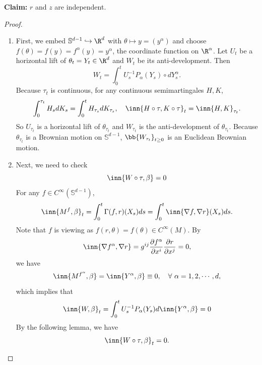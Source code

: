 \begin{exam}
    \textbf{Claim:} $r$ and $z$ are independent.
    \begin{proof}
        \begin{enumerate}[label=\Roman*.]
            \item First, we embed $\mathbb{S}^{d-1} \hookrightarrow \R^d$ with $\theta \mapsto y = (y^\alpha)$ and choose $f(\theta) = f(y) = f^\alpha(y) = y^\alpha$, the coordinate function on $\R^\alpha$. Let $U_t$ be a horizontal lift of $\theta_t = Y_t \in \R^d$ and $W_t$ be its anti-development. Then
            \begin{equation*}
                W_t = \int_0^t U_s^{-1}P_\alpha(Y_s) \circ dY^\alpha_s.
            \end{equation*}
            Because $\tau_t$ is continuous, for any continuous semimartingales $H,K$,
            \begin{equation*}
                \int_0^{\tau_t} H_sdK_s = \int_0^t H_{\tau_s} dK_{\tau_s},\quad \inn{H \circ \tau,K \circ \tau}_t = \inn{H,K}_{\tau_t}.
            \end{equation*}
            So $U_{\tau_t}$ is a horizontal lift of $\theta_{\tau_t}$ and $W_{\tau_t}$ is the anti-development of $\theta_{\tau_t}$. Because $\theta_{\tau_t}$ is a Brownian motion on $\mathbb{S}^{d-1}$, $\bb{W_{\tau_t}}_{t \geq 0}$ is an Euclidean Brownian motion.

            \item Next, we need to check
            \begin{equation*}
                \inn{W \circ \tau,\beta} = 0
            \end{equation*}
            For any $f \in C^\infty(\mathbb{S}^{d-1})$,
            \begin{equation*}
                \inn{M^f,\beta}_t = \int_0^t \Gamma(f,r)(X_s)ds = \int_0^t \inn{\nabla f,\nabla r}(X_s)ds.
            \end{equation*}
            Note that $f$ is viewing as $f(r,\theta) = f(\theta) \in C^\infty(M)$. By
            \begin{equation*}
                \inn{\nabla f^\alpha,\nabla r} = g^{ij}\frac{\partial f^\alpha}{\partial x^i}\frac{\partial r}{\partial x^j} = 0,
            \end{equation*}
            we have 
            \begin{equation*}
                \inn{M^{f^\alpha},\beta} = \inn{Y^\alpha,\beta} \equiv 0,\quad \forall~\alpha = 1,2,\cdots,d,
            \end{equation*}
            which implies that
            \begin{equation*}
                \inn{W, \beta}_t = \int_0^t U_s^{-1}P_\alpha(Y_s) d\inn{Y^\alpha,\beta} = 0
            \end{equation*}
            By the following lemma, we have
            \begin{equation*}
                \inn{W \circ \tau,\beta}_t = 0.
            \end{equation*}


\end{enumerate}
\end{proof}
\end{exam}
